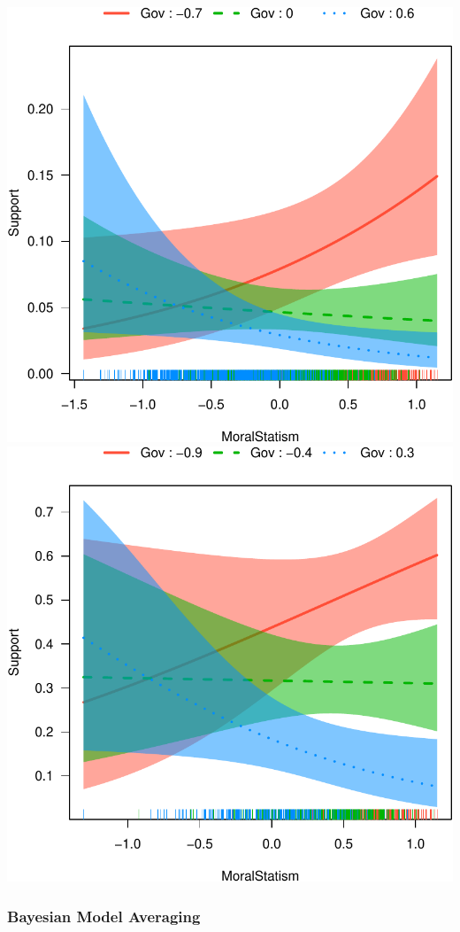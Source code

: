 \documentclass[12pt,]{article}
\begin{document}
\includegraphics{figures/effect-plot1-1.pdf}
\includegraphics{figures/effect-plot1-2.pdf}

\subsubsection{Bayesian Model Averaging}\label{bayesian-model-averaging}
\end{document}

